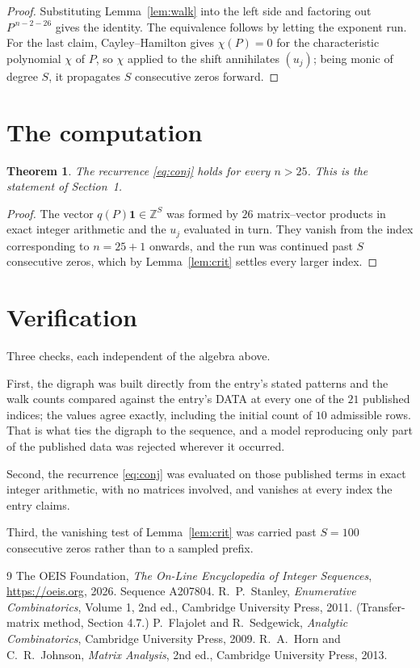 \documentclass[11pt,a4paper]{article}
\theoremstyle{plain}
\newtheorem{theorem}{Theorem}
\theoremstyle{definition}
\begin{document}
\begin{proof}
Substituting Lemma~\ref{lem:walk} into the left side and factoring out
$P^{\,n-2-26}$ gives the identity. The equivalence follows by letting the exponent
run. For the last claim, Cayley--Hamilton gives $\chi(P)=0$ for the characteristic
polynomial $\chi$ of $P$, so $\chi$ applied to the shift annihilates $(u_j)$; being monic of
degree $S$, it propagates $S$ consecutive zeros forward.
\end{proof}

\section{The computation}

\begin{theorem}
The recurrence \eqref{eq:conj} holds for every $n>25$. This is the statement of
Section~1.
\end{theorem}

\begin{proof}
The vector $q(P)\mathbf{1}\in\mathbb{Z}^{S}$ was formed by $26$ matrix--vector
products in exact integer arithmetic and the $u_j$ evaluated in turn. They vanish from the
index corresponding to $n=25+1$ onwards, and the run was continued past $S$ consecutive
zeros, which by Lemma~\ref{lem:crit} settles every larger index.
\end{proof}

\section{Verification}

Three checks, each independent of the algebra above.

First, the digraph was built directly from the entry's stated patterns and the walk counts
compared against the entry's DATA at every one of the $21$ published indices; the
values agree exactly, including the initial count of $10$ admissible rows. That is
what ties the digraph to the sequence, and a model reproducing only part of the published
data was rejected wherever it occurred.

Second, the recurrence \eqref{eq:conj} was evaluated on those published terms in exact
integer arithmetic, with no matrices involved, and vanishes at every index the entry claims.

Third, the vanishing test of Lemma~\ref{lem:crit} was carried past $S=100$ consecutive
zeros rather than to a sampled prefix.

\begin{thebibliography}{9}
 The OEIS Foundation, \emph{The On-Line Encyclopedia of Integer
Sequences}, \url{https://oeis.org}, 2026. Sequence A207804.
 R.~P.~Stanley, \emph{Enumerative Combinatorics}, Volume 1, 2nd ed.,
Cambridge University Press, 2011. (Transfer-matrix method, Section 4.7.)
 P.~Flajolet and R.~Sedgewick, \emph{Analytic Combinatorics}, Cambridge
University Press, 2009.
 R.~A.~Horn and C.~R.~Johnson, \emph{Matrix Analysis}, 2nd ed., Cambridge
University Press, 2013.
\end{thebibliography}
\end{document}
